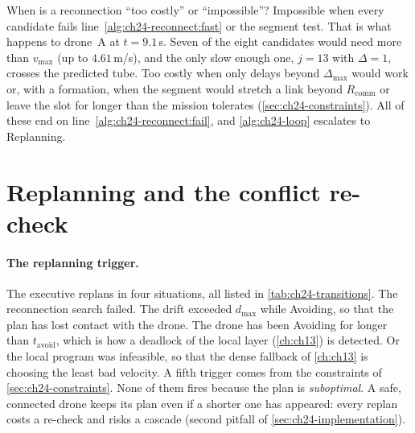 When is a reconnection ``too costly'' or ``impossible''? Impossible when
every candidate fails line~\ref{alg:ch24-reconnect:fast} or the segment
test. That is what happens to drone~A at $t = 9.1$\,s. Seven of the eight
candidates would need more than $v_{\max}$ (up to $4.61$\,m/s), and the only
slow enough one, $j = 13$ with $\Delta = 1$, crosses the predicted tube. Too costly
when only delays beyond $\Delta_{\max}$ would work or, with a formation, when
the segment would stretch a link beyond $R_{\mathrm{comm}}$ or leave the slot
for longer than the mission tolerates (\cref{sec:ch24-constraints}). All of
these end on line~\ref{alg:ch24-reconnect:fail}, and \cref{alg:ch24-loop}
escalates to Replanning.

\section{Replanning and the conflict re-check}
\label{sec:ch24-replan}

\paragraph{The replanning trigger.}
The executive replans in four situations, all listed in
\cref{tab:ch24-transitions}. The reconnection search failed. The drift
exceeded $d_{\max}$ while Avoiding, so that the plan has lost contact with
the drone. The drone has been Avoiding for longer than $t_{\mathrm{avoid}}$,
which is how a deadlock of the local layer (\cref{ch:ch13}) is detected. Or
the local program was infeasible, so that the dense fallback of
\cref{ch:ch13} is choosing the least bad velocity. A fifth trigger comes
from the constraints of \cref{sec:ch24-constraints}. None of them fires
because the plan is \emph{suboptimal}. A safe, connected drone keeps its
plan even if a shorter one has appeared: every replan costs a
re-check and risks a cascade (second pitfall of \cref{sec:ch24-implementation}).

